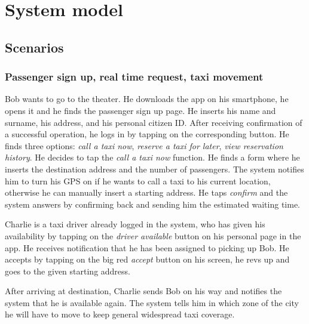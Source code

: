 \chapter{System model}

\section{Scenarios}

\subsection{Passenger sign up, real time request, taxi movement}
Bob wants to go to the theater. He downloads the \mts{} app on his smartphone, he opens it and he finds the passenger sign up page. He inserts his name and surname, his address, and his personal citizen ID. After receiving confirmation of a successful operation, he logs in by tapping on the corresponding button. He finds three options: \emph{call a taxi now}, \emph{reserve a taxi for later}, \emph{view reservation history}. He decides to tap the \emph{call a taxi now} function. He finds a form where he inserts the destination address and the number of passengers. The system notifies him to turn his GPS on if he wants to call a taxi to his current location, otherwise he can manually insert a starting address. He taps \emph{confirm} and the system answers by confirming back and sending him the estimated waiting time.

Charlie is a taxi driver already logged in the system, who has given his availability by tapping on the \emph{driver available} button on his personal page in the app. He receives notification that he has been assigned to picking up Bob. He accepts by tapping on the big red \emph{accept} button on his screen, he revs up and goes to the given starting address.

After arriving at destination, Charlie sends Bob on his way and notifies the system that he is available again. The system tells him in which zone of the city he will have to move to keep general widespread taxi coverage.

